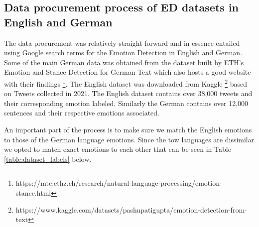 \documentclass[11pt]{article}
\begin{document}
\subsection{Data procurement process of ED datasets in English and German}
\label{sec:data-procurement-process}
The data procurement was relatively straight forward and in essence entailed using Google search terms for the Emotion Detection in English and German. Some of the main German data was obtained from the dataset built by ETH's Emotion and Stance Detection for German Text \cite{mascarell-etal-2021-stance} which also hosts a good website with their findings \footnote{https://mtc.ethz.ch/research/natural-language-processing/emotion-stance.html}. The English dataset was downloaded from Kaggle \footnote{https://www.kaggle.com/datasets/pashupatigupta/emotion-detection-from-text} based on Tweets collected in 2021. The English dataset contains over 38,000 tweets and their corresponding emotion labeled. Similarly the German contains over 12,000 sentences and their respective emotions associated.

An important part of the process is to make sure we match the English emotions to those of the German language emotions. Since the tow languages are dissimilar we opted to match exact emotions to each other that can be seen in Table \ref{table:dataset_labels} below.
\end{document}
